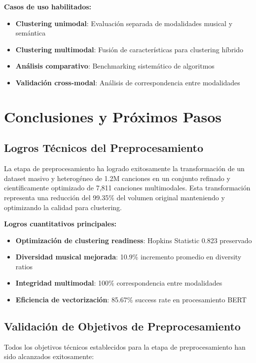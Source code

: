 \documentclass[12pt,a4paper]{article}
\begin{document}
\textbf{Casos de uso habilitados:}
\begin{itemize}[leftmargin=*]
    \item \textbf{Clustering unimodal}: Evaluación separada de modalidades musical y semántica
    \item \textbf{Clustering multimodal}: Fusión de características para clustering híbrido
    \item \textbf{Análisis comparativo}: Benchmarking sistemático de algoritmos
    \item \textbf{Validación cross-modal}: Análisis de correspondencia entre modalidades
\end{itemize}

\section{Conclusiones y Próximos Pasos}

\subsection{Logros Técnicos del Preprocesamiento}

La etapa de preprocesamiento ha logrado exitosamente la transformación de un dataset masivo y heterogéneo de 1.2M canciones en un conjunto refinado y científicamente optimizado de 7,811 canciones multimodales. Esta transformación representa una reducción del 99.35\% del volumen original manteniendo y optimizando la calidad para clustering.

\textbf{Logros cuantitativos principales:}
\begin{itemize}[leftmargin=*]
    \item \textbf{Optimización de clustering readiness}: Hopkins Statistic 0.823 preservado
    \item \textbf{Diversidad musical mejorada}: 10.9\% incremento promedio en diversity ratios
    \item \textbf{Integridad multimodal}: 100\% correspondencia entre modalidades
    \item \textbf{Eficiencia de vectorización}: 85.67\% success rate en procesamiento BERT
\end{itemize}

\subsection{Validación de Objetivos de Preprocesamiento}

Todos los objetivos técnicos establecidos para la etapa de preprocesamiento han sido alcanzados exitosamente:
\end{document}
